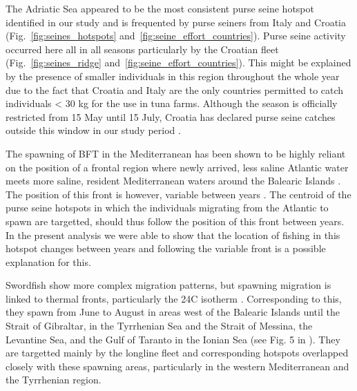 The Adriatic Sea appeared to be the most consistent purse seine hotspot identified in our study and
is frequented by purse seiners from Italy and Croatia (Fig.~\ref{fig:seines_hotspots}
and~\ref{fig:seine_effort_countries}). Purse seine activity occurred here all in all seasons
particularly by the Croatian fleet (Fig.~\ref{fig:seines_ridge}
and~\ref{fig:seine_effort_countries}). This might be explained by the presence of smaller
individuals in this region throughout the whole year due to the fact that Croatia and Italy are the
only countries permitted to catch individuals < 30 kg for the use in tuna farms. Although the
season is officially restricted from 15 May until 15 July\citep{iccat_mp}, Croatia has declared
purse seine catches outside this window in our study period .

\medskip

The spawning of BFT in the Mediterranean has been shown to be highly reliant on the position of a
frontal region where newly arrived, less saline Atlantic water meets more saline, resident
Mediterranean waters around the Balearic Islands \citep{reglero_12}. The position of this front is
however, variable between years \citep{balbin_14}. The centroid of the purse seine hotspots in
which the individuals migrating from the Atlantic to spawn are targetted, should thus follow the
position of this front between years. In the present analysis we were able to show that the
location of fishing in this hotspot changes between years and following the variable front is a
possible explanation for this.

\medskip

Swordfish show more complex migration patterns, but spawning migration is linked to thermal fronts,
particularly the 24\textdegree C isotherm \citep{palko1981swordfish,arocha_2007}. Corresponding to
this, they spawn from June to August in areas west of the Balearic Islands until the Strait of
Gibraltar, in the Tyrrhenian Sea and the Strait of Messina, the Levantine Sea, and the Gulf of
Taranto in the Ionian Sea (see Fig. 5 in \citealp{arocha_2007}). They are targetted mainly by the
longline fleet and corresponding hotspots overlapped closely with these spawning areas,
particularly in the western Mediterranean and the Tyrrhenian region.

\medskip

